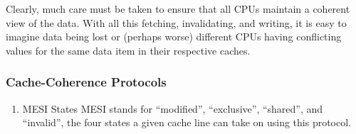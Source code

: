 \documentclass[11pt]{article}
\begin{document}
Clearly, much care must be taken to ensure that all CPUs maintain a coherent view of the data.
With all this fetching, invalidating, and writing, it is easy to imagine data being lost or
(perhaps worse) different CPUs having conflicting values for the same data item in their
respective caches.
\subsubsection{Cache-Coherence Protocols}
\label{sec:orgf9912ce}
\begin{enumerate}
\item MESI States
\label{sec:org6f3faef}
MESI stands for ``modified'', ``exclusive'', ``shared'', and ``invalid'', the four states a given cache
line can take on using this protocol.
\end{enumerate}
\end{document}
